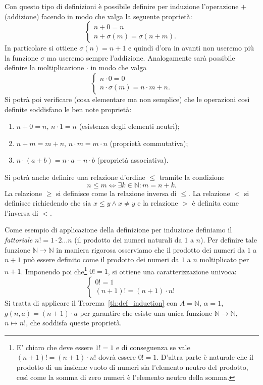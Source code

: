 \documentclass[italian,a4paper,hidelinks,headinclude]{scrartcl}
\newcommand{\NN}{{\mathbb N}}
\begin{document}
Con questo tipo di definizioni è possibile definire per induzione
l'operazione $+$ (addizione)
facendo in modo che valga la seguente proprietà:
\[
\begin{cases}
  n + 0 = n\\
  n + \sigma(m) = \sigma(n+m).
\end{cases}
\]
In particolare si ottiene $\sigma(n) = n+1$ e quindi d'ora in avanti
non useremo più la funzione $\sigma$ ma useremo sempre l'addizione.
Analogamente sarà
 possibile definire la moltiplicazione $\cdot$ in modo che
valga
\[
\begin{cases}
  n\cdot 0 = 0 \\
  n \cdot \sigma(m) = n\cdot m + n.
\end{cases}
\]
Si potrà poi verificare (cosa elementare ma non semplice)
che le operazioni così definite soddisfano le ben
note proprietà:
\begin{enumerate}
\item $n+0=n$, $n\cdot 1 = n$ (esistenza degli elementi neutri);
\item $n+m = m+n$, $n\cdot m = m\cdot n$ (proprietà commutativa);
\item $n\cdot (a+b) = n\cdot a + n\cdot b$ (proprietà associativa).
\end{enumerate}


Si potrà anche definire una relazione d'ordine $\le$ tramite la condizione
\[
  n \le m \iff \exists k \in \NN \colon m = n+k.
\]
La relazione $\ge$ si definisce come la relazione inversa di $\le$.
La relazione $<$ si
definisce richiedendo che sia $x\le y \land x\neq y$ e la relazione $>$
è definita come l'inversa di $<$.

Come esempio di applicazione della definizione per induzione definiamo
il \emph{fattoriale} $n! = 1 \cdot 2 \dots n$ (il prodotto dei numeri naturali
da $1$ a $n$).
Per definire tale funzione
$\NN \to \NN$ in maniera rigorosa osserviamo che il prodotto dei numeri da $1$
a $n+1$ può essere definito come il prodotto dei numeri da $1$ a $n$ moltiplicato
per $n+1$. Imponendo poi che\footnote{%
E' chiaro che deve essere $1!=1$ e di conseguenza se vale $(n+1)! = (n+1)\cdot n!$
dovrà essere $0!=1$.
D'altra parte è naturale che il prodotto di un insieme vuoto di numeri sia
l'elemento neutro del prodotto, così come la somma di zero numeri è l'elemento
neutro della somma.
}
$0!=1$, si ottiene una caratterizzazione univoca:
\[
 \begin{cases}
  0! = 1 \\
  (n+1)! = (n+1) \cdot n!
 \end{cases}
\]
Si tratta di applicare il Teorema~\ref{th:def_induction}
con $A=\NN$, $\alpha = 1$, $g(n, a) = (n+1)\cdot a$ per garantire che esiste
una unica funzione $\NN\to\NN$, $n\mapsto n!$, che soddisfa queste proprietà.
\end{document}
